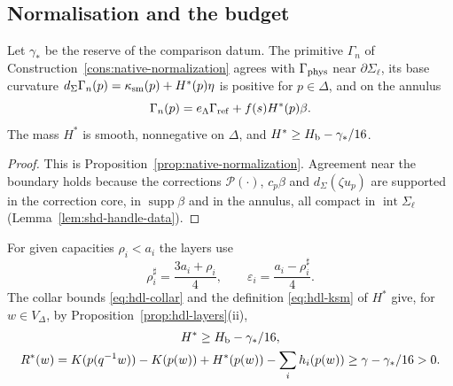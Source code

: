 \subsection{Normalisation and the budget}\label{sec:shd-datum}

\begin{lemma}\label{lem:shd-datum}
Let $\gamma_*$ be the reserve of the comparison datum. The primitive $\Gamma_n$ of
Construction~\ref{cons:native-normalization} agrees with $\Gamma_{\rm phys}$ near $\partial\Sigma_\ell$, its base curvature
$d_\Sigma\Gamma_n(p)=\kappa_{\rm sm}(p)+H^*(p)\eta$ is positive for $p\in\Delta$, and on the annulus
\begin{equation}\label{eq:shd-Gamma}
 \Gamma_n(p)=e_\Lambda\Gamma_{\rm ref}+f(s)H^*(p)\beta .
\end{equation}
The mass $H^*$ is smooth, nonnegative on $\Delta$, and $H^*\ge H_{\mathrm b}-\gamma_*/16$.
\end{lemma}
\begin{proof}
This is Proposition~\ref{prop:native-normalization}. Agreement near the boundary holds because the corrections
$\mathcal P(\cdot)$, $c_p\beta$ and $d_\Sigma(\zeta u_p)$ are supported in the correction core, in $\operatorname{supp}\beta$ and in the
annulus, all compact in $\operatorname{int}\Sigma_\ell$ (Lemma~\ref{lem:shd-handle-data}).
\end{proof}

For given capacities $\rho_i<a_i$ the layers use
\begin{equation}\label{eq:shd-constants}
 \rho_i^\sharp=\frac{3a_i+\rho_i}{4},\qquad
 \varepsilon_i=\frac{a_i-\rho_i^\sharp}{4}.
\end{equation}
The collar bounds \eqref{eq:hdl-collar} and the definition \eqref{eq:hdl-ksm} of $H^*$ give, for $w\in V_\Delta$, by Proposition~\ref{prop:hdl-layers}(ii),
\begin{multline}\label{eq:shd-budget}
 H^*\ge H_{\mathrm b}-\gamma_*/16,\\
 R^*(w)=K(p(q^{-1}w))-K(p(w))+H^*(p(w))-\sum_ih_i(p(w))\ge\gamma-\gamma_*/16>0 .
\end{multline}

